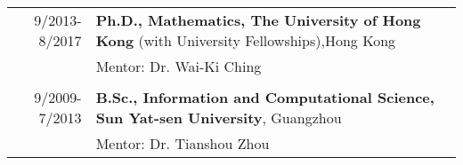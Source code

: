 \begin{longtable}{rX}
 9/2013-8/2017& \textbf{Ph.D., Mathematics, The University of Hong Kong} (with University Fellowships),Hong Kong\\
&Mentor: Dr. Wai-Ki Ching\\
&\\
9/2009-7/2013 &\textbf{B.Sc., Information and Computational Science, Sun Yat-sen University}, Guangzhou\\
 &Mentor: Dr. Tianshou Zhou\\
\end{longtable}

